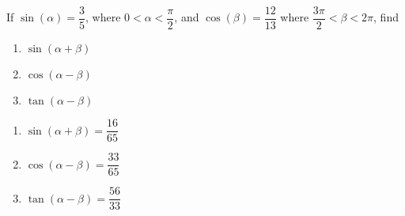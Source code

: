 {If $\sin(\alpha) = \dfrac{3}{5}$, where $0 < \alpha < \dfrac{\pi}{2}$, and $\cos(\beta) = \dfrac{12}{13}$ where $\dfrac{3\pi}{2} < \beta < 2\pi$, find 

\begin{enumerate}
\item $\sin(\alpha + \beta)$
\item $\cos(\alpha - \beta)$
\item $\tan(\alpha - \beta)$
\end{enumerate}
}
{
\begin{enumerate}
\item $\sin(\alpha + \beta) = \dfrac{16}{65}$
\item $\cos(\alpha - \beta) = \dfrac{33}{65}$
\item $\tan(\alpha - \beta) = \dfrac{56}{33}$
\end{enumerate}
}
